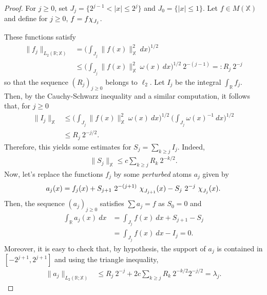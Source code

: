 \documentclass[psamsfonts]{amsart}
\newcommand{\R}{\mathbb{R}}
\newcommand{\suma}[1]{\sum\limits_{#1}}
\newcommand*{\bigchi}{\mbox{\large$\chi$}}
\newcommand{\Ltwo}{L_2}
\begin{document}
    \begin{proof}
     For $j\geq 0$, set $J_j=\{2^{j-1} < |x| \leq 2^j\}$ and $J_0=\{|x| \leq 1\}$. Let $f \in M(\mathbb{X})$ and define for $j\geq 0$, $f=f\bigchi_{J_j}$.
      
        These functions satisfy
        \begin{align*}
            \|f_j \|_{\Ltwo(\R;\mathbb{\mathbb{X}})} &= \Big( \int_{J_j} \|f(x)\|_\mathbb{\mathbb{X}}^2 \ dx \Big)^{1/2} \\
                       &\leq \Big( \int_{J_j} \|f(x)\|^2_\mathbb{X} \ \omega(x) \ dx \Big)^{1/2} \ 2^{-(j-1)}  =: R_j \ 2^{-j}
        \end{align*}
        so that the sequence $(R_j)_{j \geq 0}$ belongs to $\ell_2$. Let $I_j$ be the integral $\int_{\R} f_j$. Then, by the Cauchy-Schwarz inequality and a similar computation, it follows that, for $j \geq 0$
        \begin{align*}
            \| I_j \|_{\mathbb{X}} & \leq \Big( \int_{J_j} \|f(x)\|^2_\mathbb{X} \ \omega(x) \ dx \Big)^{1/2} \ \Big( \int_{J_j} \omega(x)^{-1} \ dx \Big)^{1/2} \\
            &\leq R_j \ 2^{-j/2}.
        \end{align*}
        Therefore, this yields some estimates for $S_j = \sum_{k \geq j} I_j$. Indeed,
        \begin{align*}
            \| S_j\|_\mathbb{X} \leq c \suma{k \geq j} R_k \ 2^{-k/2}.
        \end{align*}
        Now, let's replace the functions $f_j$ by some \emph{perturbed} atoms $a_j$ given by
        \begin{align*}
            a_j(x) = f_j(x) + S_{j+1} \ 2^{-(j+1)} \ \bigchi_{J_{j+1}}(x) - S_j \ 2^{-j} \ \bigchi_{J_j}(x).
        \end{align*}
        Then, the sequence $(a_j)_{j \geq 0}$ satisfies $\sum a_j=f$ as $S_0=0$ and 
        \begin{align*}
            \int_{\R} a_j(x) \ dx &= \int_{J_j} f(x) \ dx + S_{j+1} - S_{j} \\
            &= \int_{J_j} f(x) \ dx - I_j = 0.
        \end{align*}
        Moreover, it is easy to check that, by hypothesis, the support of $a_j$ is contained in $[-2^{j+1},2^{j+1}]$ and using the triangle inequality,
        \begin{align*}
            \|a_j\|_{\Ltwo(\R;\mathbb{X})}
            &\leq R_j \ 2^{-j} + 2c \suma{k \geq j} R_k \ 2^{-k/2} 2^{-j/2} =\lambda_j.

\end{align*}
\end{proof}
\end{document}
